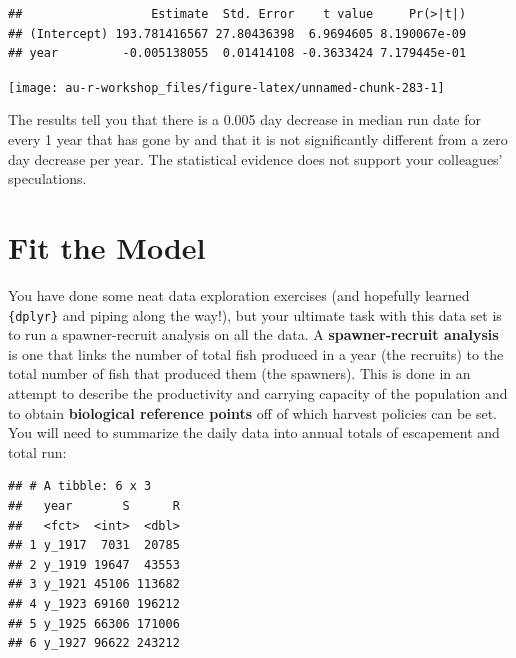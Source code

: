 \documentclass[]{book}
\newenvironment{Shaded}{\begin{snugshade}}{\end{snugshade}}
\newcommand{\DataTypeTok}[1]{\textcolor[rgb]{0.13,0.29,0.53}{#1}}
\newcommand{\KeywordTok}[1]{\textcolor[rgb]{0.13,0.29,0.53}{\textbf{#1}}}
\newcommand{\NormalTok}[1]{#1}
\newcommand{\OperatorTok}[1]{\textcolor[rgb]{0.81,0.36,0.00}{\textbf{#1}}}
\newcommand{\StringTok}[1]{\textcolor[rgb]{0.31,0.60,0.02}{#1}}
\begin{document}
\begin{verbatim}
##                  Estimate  Std. Error    t value     Pr(>|t|)
## (Intercept) 193.781416567 27.80436398  6.9694605 8.190067e-09
## year         -0.005138055  0.01414108 -0.3633424 7.179445e-01
\end{verbatim}

\begin{center}\texttt{[image: au-r-workshop\_files/figure-latex/unnamed-chunk-283-1]} \end{center}

The results tell you that there is a 0.005 day decrease in median run date for every 1 year that has gone by and that it is not significantly different from a zero day decrease per year. The statistical evidence does not support your colleagues' speculations.

\hypertarget{fit-the-model}{%
\section{Fit the Model}\label{fit-the-model}}

You have done some neat data exploration exercises (and hopefully learned \texttt{\{dplyr\}} and piping along the way!), but your ultimate task with this data set is to run a spawner-recruit analysis on all the data. A \textbf{spawner-recruit analysis} is one that links the number of total fish produced in a year (the recruits) to the total number of fish that produced them (the spawners). This is done in an attempt to describe the productivity and carrying capacity of the population and to obtain \textbf{biological reference points} off of which harvest policies can be set. You will need to summarize the daily data into annual totals of escapement and total run:

\begin{Shaded}
\end{Shaded}

\begin{verbatim}
## # A tibble: 6 x 3
##   year       S      R
##   <fct>  <int>  <dbl>
## 1 y_1917  7031  20785
## 2 y_1919 19647  43553
## 3 y_1921 45106 113682
## 4 y_1923 69160 196212
## 5 y_1925 66306 171006
## 6 y_1927 96622 243212
\end{verbatim}
\end{document}
